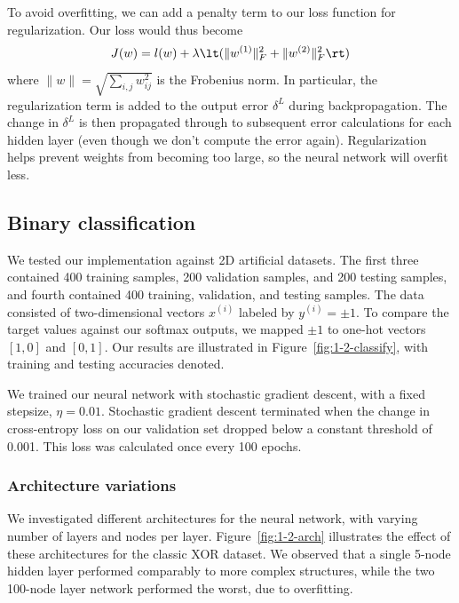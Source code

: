 \documentclass{article}
\newcommand{\sind}[1]{^{(#1)}}
\begin{document}
\begin{multicols}{2}
To avoid overfitting, we can add a penalty term to our loss function for regularization.
Our loss would thus become
\begin{equation}
    J(w) = l(w) +
      \lambda
        \lt(\lVert w^{(1)} \rVert^2_F + \lVert w^{(2)} \rVert^2_F\rt)
\end{equation}
where $\lVert w\rVert = \sqrt{\sum_{i,j}{w_{ij}^2}}$ is the Frobenius norm.
In particular, the regularization term is added to the output error $\delta^L$
during backpropagation. The change in $\delta^L$ is then propagated
through to subsequent error calculations for each hidden layer
(even though we don't compute the error again).
Regularization helps prevent weights from becoming too large,
so the neural network will overfit less.

\subsection{Binary classification}
\label{subsubsec:binary}

We tested our implementation against 2D artificial datasets.
The first three contained 400 training samples,
200 validation samples,
and 200 testing samples, and fourth contained 
400 training, validation, and testing samples.
The data consisted of two-dimensional vectors $x\sind{i}$
labeled by $y\sind{i} = \pm1$.
To compare the target values against our softmax outputs,
we mapped $\pm1$ to one-hot vectors $[1,0]$ and $[0,1]$.
Our results are illustrated in Figure~\ref{fig:1-2-classify},
with training and testing accuracies denoted.

We trained our neural network with stochastic gradient descent, with a 
fixed stepsize, $\eta = 0.01$. Stochastic gradient descent terminated when
the change in cross-entropy loss on our validation set dropped below a constant threshold of 0.001.
This loss was calculated once every 100 epochs.

\subsubsection{Architecture variations}
\label{subsubsec:binaryarch}

We investigated different architectures for the neural network,
with varying number of layers and nodes per layer.
Figure~\ref{fig:1-2-arch} illustrates the effect
of these architectures for the classic XOR dataset.
We observed that a single 5-node hidden layer
performed comparably to more complex structures,
while the two 100-node layer network performed the worst, due to overfitting.


\end{multicols}
\end{document}
